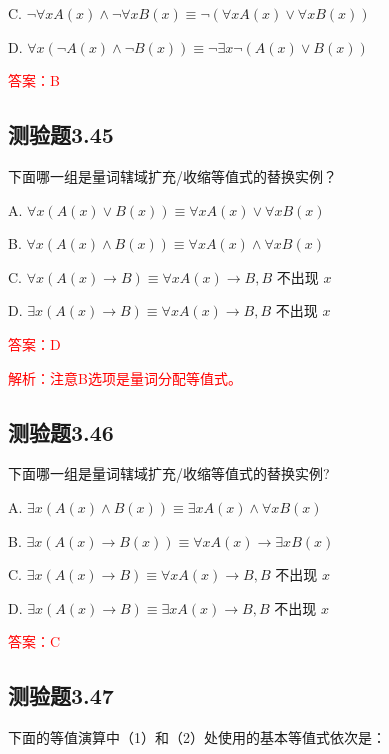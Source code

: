 \documentclass[UTF8, heading=true]{ctexart}
\begin{document}
C. $\neg \forall x A(x) \wedge \neg \forall x B(x) \equiv \neg(\forall x A(x) \vee \forall x B(x))$

D. $\forall x(\neg A(x) \wedge \neg B(x)) \equiv \neg \exists x \neg(A(x) \vee B(x))$


\textcolor{red}{答案：B}

\subsection{测验题3.45}

下面哪一组是量词辖域扩充/收缩等值式的替换实例？

A. $\forall x(A(x) \vee B(x)) \equiv \forall x A(x) \vee \forall x B(x)$

B. $\forall x(A(x) \wedge B(x)) \equiv \forall x A(x) \wedge \forall x B(x)$

C. $\forall x(A(x) \rightarrow B) \equiv \forall x A(x) \rightarrow B, B$ 不出现 $x$

D. $\exists x(A(x) \rightarrow B) \equiv \forall x A(x) \rightarrow B, B$ 不出现 $x$

\textcolor{red}{答案：D}

\textcolor{red}{解析：注意B选项是量词分配等值式。}

\subsection{测验题3.46}

下面哪一组是量词辖域扩充/收缩等值式的替换实例?

A. $\exists x(A(x) \wedge B(x)) \equiv \exists x A(x) \wedge \forall x B(x)$

B. $\exists x(A(x) \rightarrow B(x)) \equiv \forall x A(x) \rightarrow \exists x B(x)$

C. $\exists x(A(x) \rightarrow B) \equiv \forall x A(x) \rightarrow B, B$ 不出现 $x$

D. $\exists x(A(x) \rightarrow B) \equiv \exists x A(x) \rightarrow B, B$ 不出现 $x$

\textcolor{red}{答案：C}

\subsection{测验题3.47}

下面的等值演算中（1）和（2）处使用的基本等值式依次是：
\end{document}
